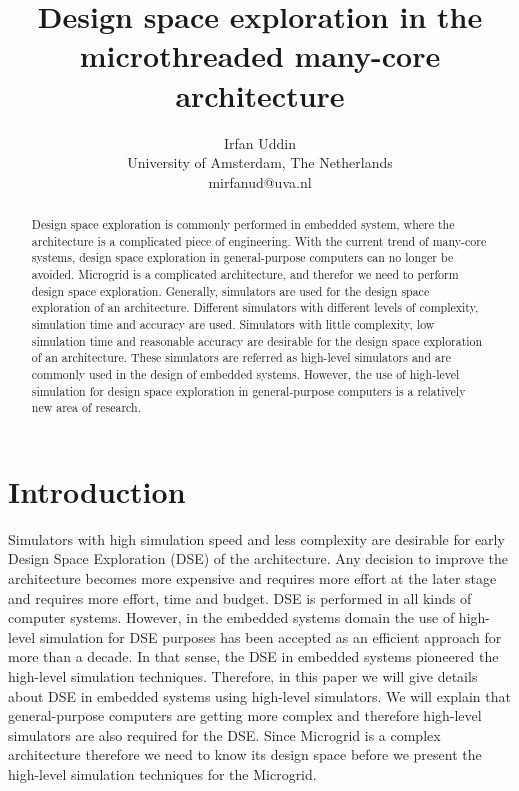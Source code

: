 \documentclass{article}
\begin{document}
\title{Design space exploration in the microthreaded many-core architecture}

\author{Irfan Uddin\\
University of Amsterdam, The Netherlands\\
mirfanud@uva.nl}

\maketitle

\begin{abstract}

Design space exploration is commonly performed in embedded system, where the
architecture is a complicated piece of engineering. With the current trend of
many-core systems, design space exploration in general-purpose computers can no
longer be avoided. Microgrid is a complicated architecture, and therefor we
need to perform design space exploration. Generally, simulators are used for
the design space exploration of an architecture. Different simulators with
different levels of complexity, simulation time and accuracy are used.
Simulators with little complexity, low simulation time and reasonable accuracy
are desirable for the design space exploration of an architecture. These
simulators are referred as high-level simulators and are commonly used in the
design of embedded systems. However, the use of high-level simulation for
design space exploration in general-purpose computers is a relatively new area
of research.

\end{abstract}

\setcounter{tocdepth}{1}
\tableofcontents

\newpage

\section{Introduction}
\label{sn:introduction}

Simulators with high simulation speed and less complexity are desirable for
early Design Space Exploration (DSE) of the architecture. Any decision to
improve the architecture becomes more expensive and requires more effort at the
later stage and requires more effort, time and budget. DSE is performed in
all kinds of computer systems. However, in the embedded systems domain the use
of high-level simulation for DSE purposes has been accepted as an efficient
approach for more than a decade. In that sense, the DSE in embedded systems
pioneered the high-level simulation techniques. Therefore, in this paper we
will give details about DSE in embedded systems using high-level simulators. We
will explain that general-purpose computers are getting more complex and
therefore high-level simulators are also required for the DSE. Since
Microgrid is a complex architecture therefore we need to know its design space
before we present the high-level simulation techniques for the Microgrid.
\end{document}
